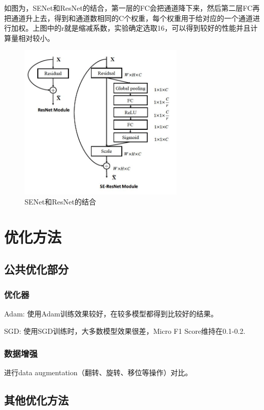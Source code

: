 \documentclass{article}
\begin{document}
如图为，SENet和ResNet的结合，第一层的FC会把通道降下来，然后第二层FC再把通道升上去，得到和通道数相同的C个权重，每个权重用于给对应的一个通道进行加权。上图中的r就是缩减系数，实验确定选取16，可以得到较好的性能并且计算量相对较小。

\begin{figure}[H]
    \centering
    \includegraphics[width=0.7\textwidth]{figures/senetwithresnet.png}
    \caption{SENet和ResNet的结合}
\end{figure}


\section{优化方法}
\subsection{公共优化部分}
\subsubsection{优化器}
Adam: 使用Adam训练效果较好，在较多模型都得到比较好的结果。\par 
SGD: 使用SGD训练时，大多数模型效果很差，Micro F1 Score维持在0.1-0.2.\par


\subsubsection{数据增强}
进行data augmentation（翻转、旋转、移位等操作）对比。



\subsection{其他优化方法}
\end{document}
